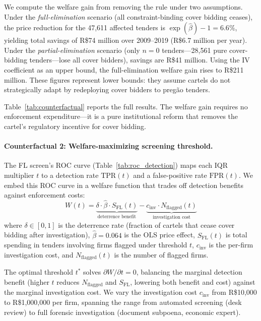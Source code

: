 We compute the welfare gain from removing the rule under two
assumptions. Under the \emph{full-elimination} scenario (all
constraint-binding cover bidding ceases), the price reduction for
the 47,611 affected tenders is $\exp(\hat{\beta}) - 1 = 6.6\%$,
yielding total savings of R\$74 million over 2009--2019 (R\$6.7
million per year). Under the \emph{partial-elimination} scenario
(only $n = 0$ tenders---28,561 pure cover-bidding tenders---lose all
cover bidders), savings are R\$41 million. Using the IV coefficient as
an upper bound, the full-elimination welfare gain rises to R\$211
million. These figures represent lower bounds: they assume cartels
do not strategically adapt by redeploying cover bidders to preg\~ao
tenders.

Table~\ref{tab:counterfactual} reports the full results. The welfare
gain requires no enforcement expenditure---it is a pure institutional
reform that removes the cartel's regulatory incentive for cover
bidding.


\paragraph{Counterfactual 2: Welfare-maximizing screening threshold.}
The FL screen's ROC curve (Table~\ref{tab:roc_detection}) maps each
IQR multiplier $t$ to a detection rate $\text{TPR}(t)$ and a
false-positive rate $\text{FPR}(t)$. We embed this ROC curve in a
welfare function that trades off detection benefits against enforcement
costs:
\begin{equation}
  W(t) = \underbrace{\delta \cdot \hat{\beta} \cdot
  S_{\text{FL}}(t)}_{\text{deterrence benefit}}
  - \underbrace{c_{\text{inv}} \cdot N_{\text{flagged}}(t)
  }_{\text{investigation cost}}
  \label{eq:welfare_screening}
\end{equation}
where $\delta \in [0,1]$ is the deterrence rate (fraction of cartels
that cease cover bidding after investigation), $\hat{\beta} = 0.064$
is the OLS price effect, $S_{\text{FL}}(t)$ is total spending in
tenders involving firms flagged under threshold $t$,
$c_{\text{inv}}$ is the per-firm investigation cost, and
$N_{\text{flagged}}(t)$ is the number of flagged firms.

The optimal threshold $t^*$ solves $\partial W / \partial t = 0$,
balancing the marginal detection benefit (higher $t$ reduces
$N_{\text{flagged}}$ and $S_{\text{FL}}$, lowering both benefit and
cost) against the marginal investigation cost. We vary the
investigation cost $c_{\text{inv}}$ from R\$10,000 to R\$1,000,000
per firm, spanning the range from automated screening (desk review)
to full forensic investigation (document subpoena, economic expert).

